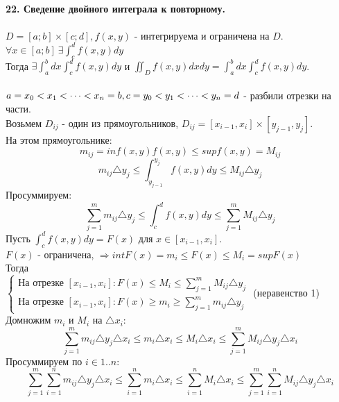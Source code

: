 \documentclass[12pt]{article}
\begin{document}
\\
\label{question22_1}\textbf{22. Сведение двойного интеграла к повторному.}\\
\\
$D = [a;b] \times [c;d], f(x,y)$ - интегрируема и ограничена на $D$.\\
$\forall x \in [a;b] \ \exists \int_c^d f(x,y) dy$\\
Тогда $\exists \int_a^b dx \int_c^d f(x,y) dy$ и $\iint_D f(x,y) dxdy = \int_a^b dx \int_c^d f(x,y) dy$.\\
\\
$a = x_0 < x_1 < \dots < x_n = b,\\ c = y_0 < y_1 <\dots < y_n = d$ - разбили отрезки на части.\\
Возьмем $D_{ij}$ - один из прямоугольников, $D_{ij} = [x_{i-1},x_i] \times [y_{j-1},y_j]$.\\
На этом прямоугольнике:\\
$$m_{ij} = inf (x,y) f(x,y) \leq sup f(x,y) = M_{ij}$$
$$m_{ij} {\bigtriangleup y_j} \leq \int_{y_{j-1}}^{y_j}f(x,y)dy \leq M_{ij}{\bigtriangleup y_j}$$
Просуммируем:\\
$$\sum_{j=1}^m m_{ij} {\bigtriangleup y_j} \leq \int_c^d f(x,y) dy \leq \sum_{j=1}^m M_{ij}{\bigtriangleup y_j}$$
Пусть $\int_c^d f(x,y)dy = F(x)$ для $x \in [x_{i-1},x_i]$.\\
$F(x)$ - ограничена, $\Rightarrow int F(x) = m_i \leq F(x) \leq M_i = sup F(x)$\\
Тогда\\
$\begin{cases}
\text{На отрезке } [x_{i-1},x_i] : F(x) \leq M_i \leq \sum_{j=1}^m M_{ij}{\bigtriangleup y_j} \\
\text{На отрезке } [x_{i-1},x_i] : F(x) \geq m_i \geq \sum_{j=1}^m m_{ij}{\bigtriangleup y_j}
\end{cases}$ (неравенство 1)\\
Домножим $m_i$ и $M_i$ на ${\bigtriangleup x_i}$:\\
$$\sum_{j=1}^m m_{ij}{\bigtriangleup y_j}{\bigtriangleup x_i} \leq m_i{\bigtriangleup x_i} \leq M_i{\bigtriangleup x_i} \leq \sum_{j=1}^m M_{ij}{\bigtriangleup y_j}{\bigtriangleup x_i}$$
Просуммируем по $i \in 1..n$:\\
$$\sum_{j=1}^m \sum_{i=1}^n m_{ij}{\bigtriangleup y_j}{\bigtriangleup x_i} \leq \sum_{i=1}^n m_i{\bigtriangleup x_i}\leq \sum_{i=1}^n M_i{\bigtriangleup x_i} \leq  \sum_{j=1}^m \sum_{i=1}^n M_{ij}{\bigtriangleup y_j}{\bigtriangleup x_i}$$
\end{document}

